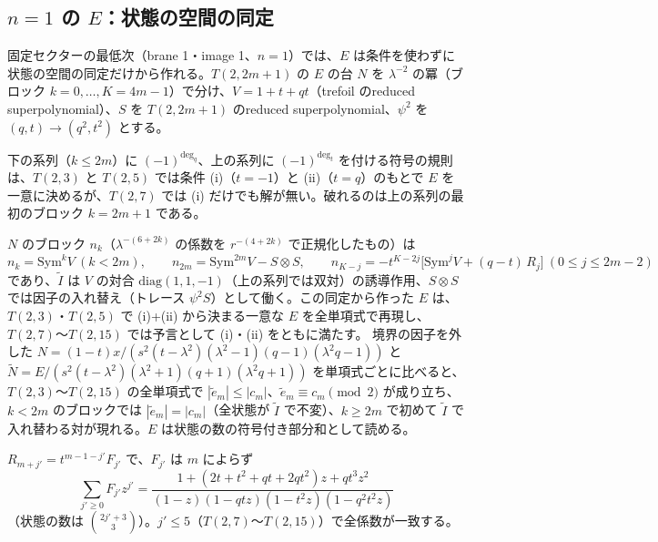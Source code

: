 \subsection{$n = 1$ の $E$：状態の空間の同定}\label{sec:principle}
固定セクターの最低次（brane 1・image 1、$n = 1$）では、$E$ は条件を使わずに状態の空間の同定だけから作れる。$T(2,2m+1)$ の $E$ の台 $N$ を $\lambda^{-2}$ の冪（ブロック $k = 0, \dots, K = 4m-1$）で分け、$V = 1 + t + qt$（trefoil のreduced superpolynomial）、$S$ を $T(2,2m+1)$ のreduced superpolynomial、$\psi^2$ を $(q, t)\to(q^2, t^2)$ とする。
\begin{compresult}[符号の規則の破れ]\label{cr:signrule}
下の系列（$k \le 2m$）に $(-1)^{\deg_q}$、上の系列に $(-1)^{\deg_t}$ を付ける符号の規則は、$T(2,3)$ と $T(2,5)$ では条件 (i)（$t = -1$）と (ii)（$t = q$）のもとで $E$ を一意に決めるが、$T(2,7)$ では (i) だけでも解が無い。破れるのは上の系列の最初のブロック $k = 2m+1$ である。
\end{compresult}
\begin{compresult}\label{cr:principle}
$N$ のブロック $n_k$（$\lambda^{-(6+2k)}$ の係数を $r^{-(4+2k)}$ で正規化したもの）は
\[
n_k = \mathrm{Sym}^k V \ (k < 2m),\qquad n_{2m} = \mathrm{Sym}^{2m}V - S\otimes S,\qquad n_{K-j} = -t^{K-2j}\bigl[\mathrm{Sym}^j V + (q-t)\,R_j\bigr]\ (0 \le j \le 2m-2)
\]
であり、$\tilde I$ は $V$ の対合 $\mathrm{diag}(1, 1, -1)$（上の系列では双対）の誘導作用、$S\otimes S$ では因子の入れ替え（トレース $\psi^2 S$）として働く。この同定から作った $E$ は、$T(2,3)$・$T(2,5)$ で (i)+(ii) から決まる一意な $E$ を全単項式で再現し、$T(2,7)$〜$T(2,15)$ では予言として (i)・(ii) をともに満たす。
境界の因子を外した $N = (1-t)x/(s^2(t-\lambda^2)(\lambda^2-1)(q-1)(\lambda^2q-1))$ と $\tilde N = E/(s^2(t-\lambda^2)(\lambda^2+1)(q+1)(\lambda^2q+1))$ を単項式ごとに比べると、$T(2,3)$〜$T(2,15)$ の全単項式で $|\tilde e_m| \le |c_m|$、$\tilde e_m \equiv c_m \pmod 2$ が成り立ち、$k < 2m$ のブロックでは $|\tilde e_m| = |c_m|$（全状態が $\tilde I$ で不変）、$k \ge 2m$ で初めて $\tilde I$ で入れ替わる対が現れる。$E$ は状態の数の符号付き部分和として読める。
\end{compresult}
\begin{conjecture}[補正の形]\label{conj:correction}
$R_{m+j'} = t^{m-1-j'}F_{j'}$ で、$F_{j'}$ は $m$ によらず
\[
\sum_{j'\ge 0}F_{j'}z^{j'} = \frac{1 + (2t + t^2 + qt + 2qt^2)z + qt^3z^2}{(1-z)(1-qtz)(1-t^2z)(1-q^2t^2z)}
\]
（状態の数は $\binom{2j'+3}{3}$）。$j' \le 5$（$T(2,7)$〜$T(2,15)$）で全係数が一致する。
\end{conjecture}
